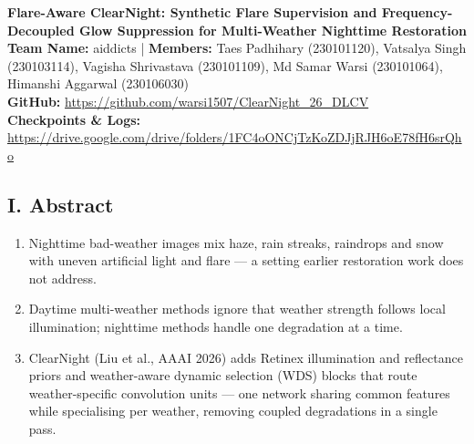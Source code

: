 \documentclass[8pt,a4paper]{article}
\begin{document}
\thispagestyle{empty}

\begin{center}

{\large\bfseries
Flare-Aware ClearNight: Synthetic Flare Supervision and Frequency-Decoupled Glow Suppression for Multi-Weather Nighttime Restoration}\\[5pt]

\textbf{Team Name:} aiddicts
\quad | \quad
\textbf{Members:}
Taes Padhihary (230101120), Vatsalya Singh (230103114), Vagisha Shrivastava (230101109), Md Samar Warsi (230101064), Himanshi Aggarwal (230106030)\\[3pt]

\textbf{GitHub:}
\url{https://github.com/warsi1507/ClearNight_26_DLCV}\\[2pt]

\textbf{Checkpoints \& Logs:}
\url{https://drive.google.com/drive/folders/1FC4oONCjTzKoZDJjRJH6oE78fH6srQho}

\end{center}

\vspace{-5pt}

\subsection*{I. Abstract}
\begin{enumerate}
    \item Nighttime bad-weather images mix haze, rain streaks, raindrops and snow with uneven artificial light and flare — a setting earlier restoration work does not address.
    \item Daytime multi-weather methods ignore that weather strength follows local illumination; nighttime methods handle one degradation at a time.
    \item ClearNight (Liu et al., AAAI 2026) adds Retinex illumination and reflectance priors and weather-aware dynamic selection (WDS) blocks that route weather-specific convolution units — one network sharing common features while specialising per weather, removing coupled degradations in a single pass.
\end{enumerate}

\end{document}
